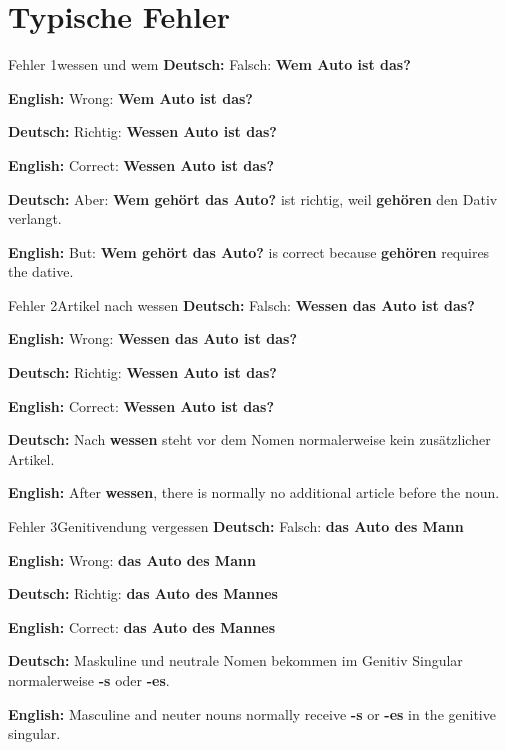 \documentclass[a4paper,11pt]{article}
\newcommand{\GermanText}[1]{\textbf{Deutsch: }#1\par}
\newcommand{\EnglishText}[1]{{\small\color{SoftGray}\textbf{English: }#1\par}}
\begin{document}
    
    \section{Typische Fehler}
        
        \begin{grammarentry}{Fehler 1}{wessen und wem}
            \GermanText{Falsch: \textbf{Wem Auto ist das?}}
            \EnglishText{Wrong: \textbf{Wem Auto ist das?}}
            
            \GermanText{Richtig: \textbf{Wessen Auto ist das?}}
            \EnglishText{Correct: \textbf{Wessen Auto ist das?}}
            
            \GermanText{Aber: \textbf{Wem gehört das Auto?} ist richtig, weil \textbf{gehören} den Dativ verlangt.}
            \EnglishText{But: \textbf{Wem gehört das Auto?} is correct because \textbf{gehören} requires the dative.}
        \end{grammarentry}
        
        
        \begin{grammarentry}{Fehler 2}{Artikel nach wessen}
            \GermanText{Falsch: \textbf{Wessen das Auto ist das?}}
            \EnglishText{Wrong: \textbf{Wessen das Auto ist das?}}
            
            \GermanText{Richtig: \textbf{Wessen Auto ist das?}}
            \EnglishText{Correct: \textbf{Wessen Auto ist das?}}
            
            \GermanText{Nach \textbf{wessen} steht vor dem Nomen normalerweise kein zusätzlicher Artikel.}
            \EnglishText{After \textbf{wessen}, there is normally no additional article before the noun.}
        \end{grammarentry}
        
        
        \begin{grammarentry}{Fehler 3}{Genitivendung vergessen}
            \GermanText{Falsch: \textbf{das Auto des Mann}}
            \EnglishText{Wrong: \textbf{das Auto des Mann}}
            
            \GermanText{Richtig: \textbf{das Auto des Mannes}}
            \EnglishText{Correct: \textbf{das Auto des Mannes}}
            
            \GermanText{Maskuline und neutrale Nomen bekommen im Genitiv Singular normalerweise \textbf{-s} oder \textbf{-es}.}
            \EnglishText{Masculine and neuter nouns normally receive \textbf{-s} or \textbf{-es} in the genitive singular.}
        \end{grammarentry}
    
\end{document}
